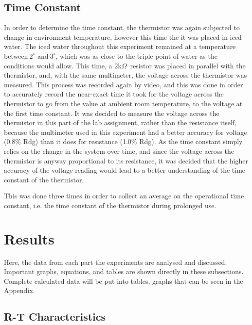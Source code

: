 \documentclass[a4,11pt]{article}
\begin{document}
\subsection{Time Constant}
In order to determine the time constant, the thermistor was again subjected to change in environment temperature, however this time the it was placed in iced water. The iced water throughout this experiment remained at a temperature between$~2^{\circ}$ and$~3^{\circ}$, which was as close to the triple point of water as the conditions would allow. This time, a 2k$\Omega$\ resistor was placed in parallel with the thermistor, and, with the same multimeter, the voltage across the thermistor was measured. This process was recorded again by video, and this was done in order to accurately record the near-exact time it took for the voltage across the thermistor to go from the value at ambient room temperature, to the voltage at the first time constant. It was decided to measure the voltage across the thermistor in this part of the lab assignment, rather than the resistance itself, because the multimeter used in this experiment had a better accuracy for voltage (0.8\% Rdg) than it does for resistance (1.0\% Rdg). As the time constant simply relies on the change in the system over time, and since the voltage across the thermistor is anyway proportional to its resistance, it was decided that the higher accuracy of the voltage reading would lead to a better understanding of the time constant of the thermistor.

This was done three times in order to collect an average on the operational time constant, i.e. the time constant of the thermistor during prolonged use.
\section{Results}
Here, the data from each part the experiments are analysed and discussed. Important graphs, equations, and tables are shown directly in these subsections. Complete calculated data will be put into tables, graphs that can be seen in the Appendix.
\subsection{R-T Characteristics}
\end{document}
